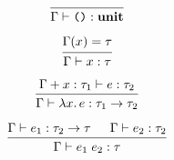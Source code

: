 \documentclass[12pt]{article}
\begin{document}
\pagestyle{empty}

\[
    \begin{prooftree}
        \infer0{\Gamma \vdash \text{\texttt{()}}: \mathbf{unit}}
    \end{prooftree}
\]

\[
    \begin{prooftree}
        \hypo{\Gamma(x) = \tau}
        \infer1{\Gamma \vdash x: \tau}
    \end{prooftree}
\]

\[
    \begin{prooftree}
        \hypo{\Gamma + x:\tau_1 \vdash e: \tau_2}
        \infer1{\Gamma \vdash \lambda x\ldotp e: \tau_1 \to \tau_2}
    \end{prooftree}
\]

\[
    \begin{prooftree}
        \hypo{\Gamma \vdash e_1: \tau_2 \to \tau}
        \hypo{\Gamma \vdash e_2: \tau_2}
        \infer2{\Gamma \vdash e_1\; e_2: \tau}
    \end{prooftree}
\]
\end{document}
